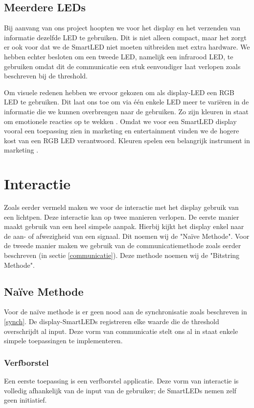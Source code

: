 \documentclass{article}
\begin{document}
\subsection{Meerdere LEDs}
Bij aanvang van ons project hoopten we voor het display en het verzenden van informatie dezelfde LED te gebruiken. Dit is niet alleen compact, maar het zorgt er ook voor dat we de SmartLED niet moeten uitbreiden met extra hardware. We hebben echter besloten om een tweede LED, namelijk een infrarood LED, te gebruiken omdat dit de communicatie een stuk eenvoudiger laat verlopen  zoals beschreven bij de threshold. 

Om visuele redenen hebben we ervoor gekozen om als display-LED een RGB LED te gebruiken. Dit laat ons toe om via \'e\'en enkele LED meer te vari\"eren in de informatie die we kunnen overbrengen naar de gebruiken. Zo zijn kleuren in staat om emotionele reacties op te wekken \cite{color}. Omdat we voor een SmartLED display vooral een toepassing zien in marketing en entertainment vinden we de hogere kost van een RGB LED verantwoord. Kleuren spelen een belangrijk instrument in marketing \cite{marketing}.

\section{Interactie}\label{interactie}
Zoals eerder vermeld maken we voor de interactie met het display gebruik van een lichtpen. Deze interactie kan op twee manieren verlopen. De eerste manier maakt gebruik van een heel simpele aanpak. Hierbij kijkt het display enkel naar de aan- of afwezigheid van een signaal. Dit noemen wij de "Na\"ive Methode". Voor de tweede manier maken we gebruik van de communicatiemethode zoals eerder beschreven (in sectie \ref{communicatie}). Deze methode noemen wij de "Bitstring Methode".

\subsection{Na\"ive Methode}

Voor de na\"ive methode is er geen nood aan de synchronisatie zoals beschreven in \ref{synch}. De display-SmartLEDs registreren elke waarde die de threshold overschrijdt al input. Deze vorm van communicatie stelt ons al in staat enkele simpele toepassingen te implementeren.

\subsubsection{Verfborstel}
Een eerste toepassing is een verfborstel applicatie. Deze vorm van interactie is volledig afhankelijk van de input van de gebruiker; de SmartLEDs nemen zelf geen initiatief.
\end{document}
